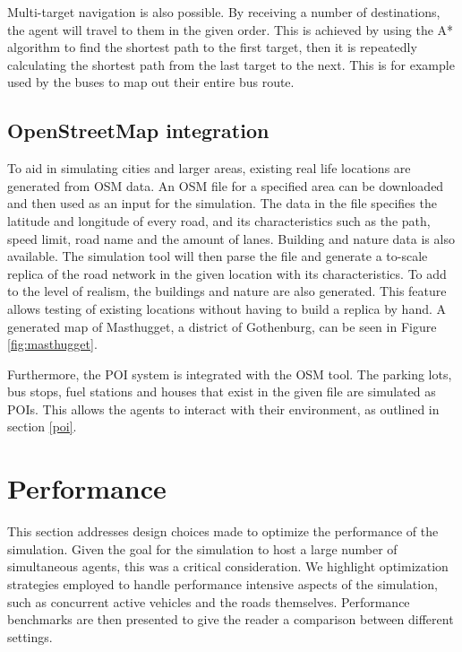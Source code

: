         Multi-target navigation is also possible. By receiving a number of destinations, the agent will travel to them in the given order. This is achieved by using the A* algorithm to find the shortest path to the first target, then it is repeatedly calculating the shortest path from the last target to the next. This is for example used by the buses to map out their entire bus route.
        

    \subsection{OpenStreetMap integration}
        To aid in simulating cities and larger areas, existing real life locations are generated from OSM data. An OSM file for a specified area can be downloaded and then used as an input for the simulation. The data in the file specifies the latitude and longitude of every road, and its characteristics such as the path, speed limit, road name and the amount of lanes. Building and nature data is also available. The simulation tool will then parse the file and generate a to-scale replica of the road network in the given location with its characteristics. To add to the level of realism, the buildings and nature are also generated. This feature allows testing of existing locations without having to build a replica by hand. A generated map of Masthugget, a district of Gothenburg, can be seen in Figure \ref{fig:masthugget}.

        Furthermore, the POI system is integrated with the OSM tool. The parking lots, bus stops, fuel stations and houses that exist in the given file are simulated as POIs. This allows the agents to interact with their environment, as outlined in section \ref{poi}.


\section{Performance}
    This section addresses design choices made to optimize the performance of the simulation. Given the goal for the simulation to host a large number of simultaneous agents, this was a critical consideration. We highlight optimization strategies employed to handle performance intensive aspects of the simulation, such as concurrent active vehicles and the roads themselves. Performance benchmarks are then presented to give the reader a comparison between different settings.

